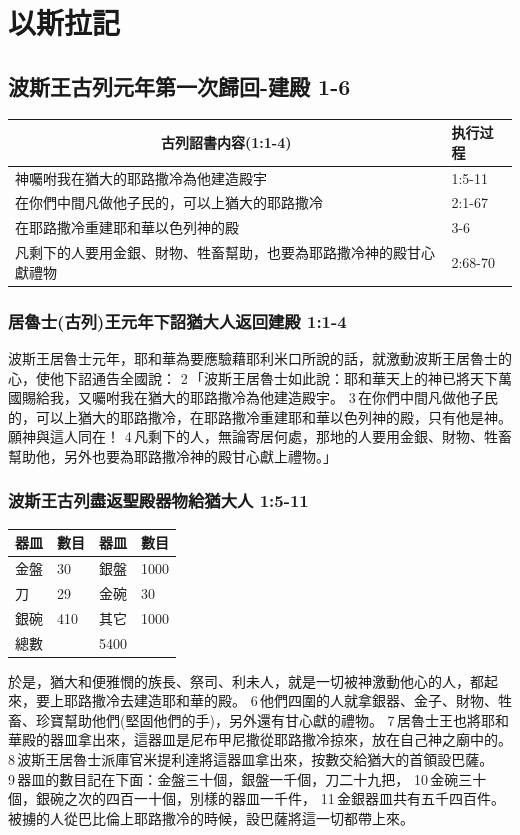 \chapter{以斯拉記}
\section{波斯王古列元年第一次歸回-建殿 1-6}
\begin{table}[H]
\centering 
\begin{tabular}{p{12cm}|p{1.5cm}}\hline\hline
\multicolumn{1}{c|}{古列詔書内容(1:1-4)}&执行过程\\\hline
神囑咐我在猶大的耶路撒冷為他建造殿宇&1:5-11\\\hline
在你們中間凡做他子民的，可以上猶大的耶路撒冷&2:1-67\\\hline
在耶路撒冷重建耶和華以色列神的殿&3-6 \\\hline
凡剩下的人要用金銀、財物、牲畜幫助，也要為耶路撒冷神的殿甘心獻禮物&2:68-70\\\hline
\end{tabular}
\end{table}

\subsection{居魯士(古列)王元年下詔猶大人返回建殿 1:1-4 }
波斯王居魯士元年，耶和華為要應驗藉耶利米口所說的話，就激動波斯王居魯士的心，使他下詔通告全國說： 2 「波斯王居魯士如此說：耶和華天上的神已將天下萬國賜給我，又囑咐我在猶大的耶路撒冷為他建造殿宇。 3 在你們中間凡做他子民的，可以上猶大的耶路撒冷，在耶路撒冷重建耶和華以色列神的殿，只有他是神。願神與這人同在！ 4 凡剩下的人，無論寄居何處，那地的人要用金銀、財物、牲畜幫助他，另外也要為耶路撒冷神的殿甘心獻上禮物。」

\subsection{波斯王古列盡返聖殿器物給猶大人 1:5-11 }
\begin{table}
\centering 
\begin{tabular}{p{1cm}|p{1cm}|p{1cm}|p{1cm}}\hline\hline
器皿&數目& 器皿&數目\\\hline
金盤&30 &銀盤 &1000 \\\hline
刀&29 &金碗 &30 \\\hline
銀碗&410 &其它&1000 \\\hline
總數 &\multicolumn{3}{c}{5400} \\\hline
\end{tabular}
\end{table}
於是，猶大和便雅憫的族長、祭司、利未人，就是一切被神激動他心的人，都起來，要上耶路撒冷去建造耶和華的殿。 6 他們四圍的人就拿銀器、金子、財物、牲畜、珍寶幫助他們(堅固他們的手)，另外還有甘心獻的禮物。 7 居魯士王也將耶和華殿的器皿拿出來，這器皿是尼布甲尼撒從耶路撒冷掠來，放在自己神之廟中的。 8 波斯王居魯士派庫官米提利達將這器皿拿出來，按數交給猶大的首領設巴薩。 9 器皿的數目記在下面：金盤三十個，銀盤一千個，刀二十九把， 10 金碗三十個，銀碗之次的四百一十個，別樣的器皿一千件， 11 金銀器皿共有五千四百件。被擄的人從巴比倫上耶路撒冷的時候，設巴薩將這一切都帶上來。



